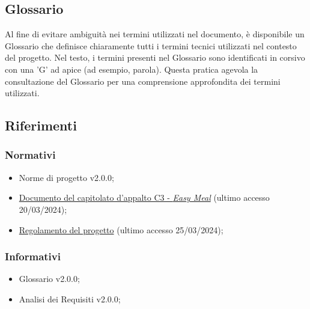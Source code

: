 \subsection{Glossario}
Al fine di evitare ambiguità nei termini utilizzati nel documento, è disponibile 
un Glossario che definisce chiaramente tutti i termini tecnici utilizzati nel 
contesto del progetto. Nel testo, i termini presenti nel Glossario sono 
identificati in corsivo con una 'G' ad apice (ad esempio, parola\g ). 
Questa pratica agevola la consultazione del Glossario per una comprensione 
approfondita dei termini utilizzati.

\subsection{Riferimenti}
\subsubsection{Normativi}
\begin{itemize}
	\item Norme di progetto v2.0.0;
	\item 	\href{https://www.math.unipd.it/~tullio/IS-1/2023/Progetto/C3.pdf}
	      {Documento del capitolato d'appalto C3 - \textit{Easy Meal}} (ultimo accesso 20/03/2024);
	\item \href{https://www.math.unipd.it/~tullio/IS-1/2023/Dispense/PD2.pdf}
	      {Regolamento del progetto} (ultimo accesso 25/03/2024); 
\end{itemize}

\subsubsection{Informativi}
\begin{itemize}
	\item Glossario v2.0.0;
	\item Analisi dei Requisiti v2.0.0;
\end{itemize}
